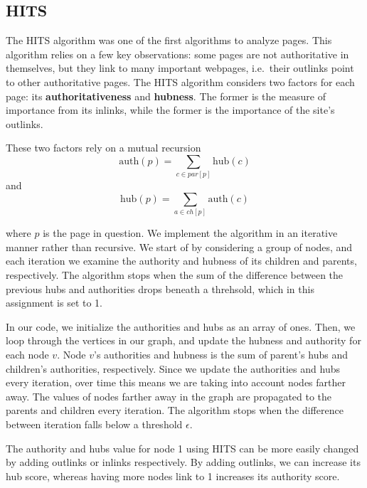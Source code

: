 \documentclass[
  paper=a4,
,captions=tableheading
]{scrartcl}
\begin{document}
\hypertarget{hits}{%
\subsection{HITS}\label{hits}}

The HITS algorithm was one of the first algorithms to analyze pages.
This algorithm relies on a few key observations: some pages are not
authoritative in themselves, but they link to many important webpages,
i.e.~their outlinks point to other authoritative pages. The HITS
algorithm considers two factors for each page: its
\textbf{authoritativeness} and \textbf{hubness}. The former is the
measure of importance from its inlinks, while the former is the
importance of the site's outlinks.

These two factors rely on a mutual recursion \begin{equation}
    \textrm{auth}(p) = \sum_{c\in par[p]}\textrm{hub}(c)
\end{equation} and \begin{equation}
    \textrm{hub}(p) = \sum_{a\in ch[p]}\textrm{auth}(c)
\end{equation}

where \(p\) is the page in question. We implement the algorithm in an
iterative manner rather than recursive. We start of by considering a
group of nodes, and each iteration we examine the authority and hubness
of its children and parents, respectively. The algorithm stops when the
sum of the difference between the previous hubs and authorities drops
beneath a threhsold, which in this assignment is set to 1.

In our code, we initialize the authorities and hubs as an array of ones.
Then, we loop through the vertices in our graph, and update the hubness
and authority for each node \(v\). Node \(v\)'s authorities and hubness
is the sum of parent's hubs and children's authorities, respectively.
Since we update the authorities and hubs every iteration, over time this
means we are taking into account nodes farther away. The values of nodes
farther away in the graph are propagated to the parents and children
every iteration. The algorithm stops when the difference between
iteration falls below a threshold \(\epsilon\).

The authority and hubs value for node 1 using HITS can be more easily
changed by adding outlinks or inlinks respectively. By adding outlinks,
we can increase its hub score, whereas having more nodes link to 1
increases its authority score.
\end{document}
